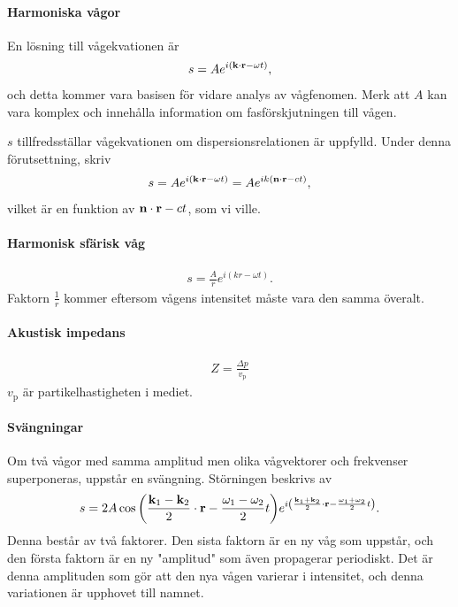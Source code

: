 \paragraph{Harmoniska vågor}
En lösning till vågekvationen är
\begin{align*}
	s = Ae^{i(\vect{k}\cdot\vect{r} - \omega t)},
\end{align*}
och detta kommer vara basisen för vidare analys av vågfenomen. Merk att $A$ kan vara komplex och innehålla information om fasförskjutningen till vågen.

\deriv
$s$ tillfredsställar vågekvationen om dispersionsrelationen är uppfylld. Under denna förutsettning, skriv
\begin{align*}
	s = Ae^{i(\vect{k}\cdot\vect{r} - \omega t)} = Ae^{ik(\vect{n}\cdot\vect{r} - ct)},
\end{align*}
vilket är en funktion av $\vect{n}\cdot\vect{r} - ct$, som vi ville.

\paragraph{Harmonisk sfärisk våg}
\begin{align*}
	s = \frac{A}{r}e^{i(kr - \omega t)}.
\end{align*}
Faktorn $\frac{1}{r}$ kommer eftersom vågens intensitet måste vara den samma överalt.

\paragraph{Akustisk impedans}
\begin{align*}
	Z = \frac{\Delta p}{v_{\text{p}}}
\end{align*}
$v_{\text{p}}$ är partikelhastigheten i mediet.

\paragraph{Svängningar}
Om två vågor med samma amplitud men olika vågvektorer och frekvenser superponeras, uppstår en svängning. Störningen beskrivs av
\begin{align*}
	s = 2A\cos{\left(\frac{\vect{k}_{1} - \vect{k}_{2}}{2}\cdot\vect{r} - \frac{\omega_{1} - \omega_{2}}{2}t\right)}e^{i\left(\frac{\vect{k}_{1} + \vect{k}_{2}}{2}\cdot\vect{r} - \frac{\omega_{1} + \omega_{2}}{2}t\right)}.
\end{align*}
Denna består av två faktorer. Den sista faktorn är en ny våg som uppstår, och den första faktorn är en ny "amplitud" som även propagerar periodiskt. Det är denna amplituden som gör att den nya vågen varierar i intensitet, och denna variationen är upphovet till namnet.


